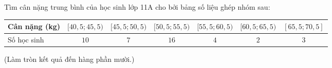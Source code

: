\begin{ex}
Tìm cân nặng trung bình của học sinh lớp 11A cho bởi bảng số liệu ghép nhóm sau:
\begin{center}\small\begin{tabular}{|l|c|c|c|c|c|c|}\hline
Cân nặng (kg) & $[40{,}5;45{,}5)$ & $[45{,}5;50{,}5)$ & $[50{,}5;55{,}5)$ & $[55{,}5;60{,}5)$ & $[60{,}5;65{,}5)$ & $[65{,}5;70{,}5]$\\\hline
Số học sinh & $10$ & $7$ & $16$ & $4$ & $2$ & $3$\\\hline
\end{tabular}\end{center}
(Làm tròn kết quả đến hàng phần mười.)
\end{ex}
